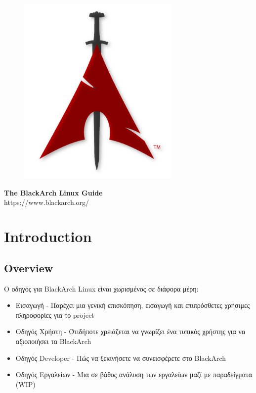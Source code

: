 \documentclass[a4paper, oneside, 11pt]{book}
\begin{document}
\pagestyle{empty}
\begin{center}
\begin{figure}[htbp]
\centering
\vspace{0.5cm}
\includegraphics[width=8cm]{images/logo.png}
\label{fig:logo}
\end{figure}
\vspace{0.5cm}
\Huge{\textbf{The BlackArch Linux Guide}}\\
\vspace{1cm}
\Large{\color{red}https://www.blackarch.org/}\\
\vspace{0.5cm}
\end{center}
\newpage
\tableofcontents
\newpage
\pagestyle{fancy}


\chapter{Introduction}

\section{Overview}
Ο οδηγός για BlackArch Linux είναι χωρισμένος σε διάφορα μέρη:
\begin{itemize}
\item Εισαγωγή - Παρέχει μια γενική επισκόπηση, εισαγωγή και επιπρόσθετες χρήσιμες πληροφορίες για το project
\item Οδηγός Χρήστη - Ότιδήποτε χρειάζεται να γνωρίζει ένα τυπικός χρήστης για να αξιοποιήσει τα BlackArch
\item Οδηγός Developer - Πώς να ξεκινήσετε να συνεισφέρετε στο BlackArch
\item Οδηγός Εργαλείων - Μια σε βάθος ανάλυση των εργαλείων μαζί με παραδείγματα (WIP)
\end{itemize}
\end{document}
